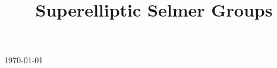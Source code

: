 

\title{Superelliptic Selmer Groups}

\usepackage[sort=standard]{glossaries} 
\makeglossaries



\maketitle
\centerline{\today}
\tableofcontents








